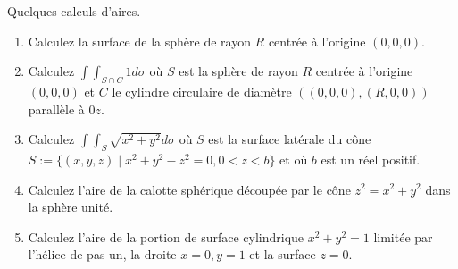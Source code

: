 
\begin{exercice}\label{exoVariete0012}

	Quelques calculs d'aires.
\begin{enumerate}
\item Calculez la surface de la sphère de rayon $R$ centrée à l'origine $(0,0,0)$.

\item Calculez $ \int\! \! \int_{S \cap C}  1 d \sigma $ où $S$ est la sphère de rayon $R$ centrée à l'origine $(0,0,0)$ et $C$ le cylindre circulaire de diamètre $((0,0,0),(R,0,0))$ parallèle à $0z$.

\item Calculez $ \int\! \! \int_{S}  \sqrt{x^2 + y^2} d \sigma $
où $S$ est la surface latérale du cône $S:= \{ (x,y,z) \mid x^2 + y^2 
-z^2 =0, 0<z<b \}$ et où $b$ est un réel positif.

\item Calculez l'aire de la calotte sphérique découpée par le cône $z^2=x^2+y^2$ dans la sphère unité.

\item Calculez l'aire de la portion de surface cylindrique $x^2+y^2=1$ limitée par l'hélice de pas un, la droite $x=0,y=1$ et la surface $z=0$.

\end{enumerate}

\end{exercice}
